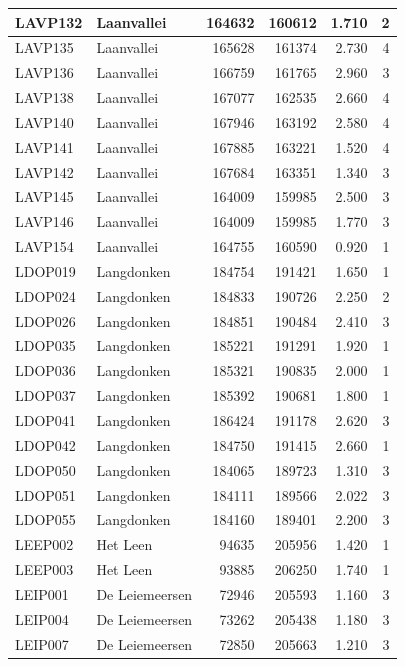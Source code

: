 \documentclass[11pt,]{book}
\begin{document}
\begin{table}
\begin{tabular}[t]{l|l|r|r|r|r}
LAVP132 & Laanvallei & 164632 & 160612 & 1.710 & 2\\
\hline
LAVP135 & Laanvallei & 165628 & 161374 & 2.730 & 4\\
\hline
LAVP136 & Laanvallei & 166759 & 161765 & 2.960 & 3\\
\hline
LAVP138 & Laanvallei & 167077 & 162535 & 2.660 & 4\\
\hline
LAVP140 & Laanvallei & 167946 & 163192 & 2.580 & 4\\
\hline
LAVP141 & Laanvallei & 167885 & 163221 & 1.520 & 4\\
\hline
LAVP142 & Laanvallei & 167684 & 163351 & 1.340 & 3\\
\hline
LAVP145 & Laanvallei & 164009 & 159985 & 2.500 & 3\\
\hline
LAVP146 & Laanvallei & 164009 & 159985 & 1.770 & 3\\
\hline
LAVP154 & Laanvallei & 164755 & 160590 & 0.920 & 1\\
\hline
LDOP019 & Langdonken & 184754 & 191421 & 1.650 & 1\\
\hline
LDOP024 & Langdonken & 184833 & 190726 & 2.250 & 2\\
\hline
LDOP026 & Langdonken & 184851 & 190484 & 2.410 & 3\\
\hline
LDOP035 & Langdonken & 185221 & 191291 & 1.920 & 1\\
\hline
LDOP036 & Langdonken & 185321 & 190835 & 2.000 & 1\\
\hline
LDOP037 & Langdonken & 185392 & 190681 & 1.800 & 1\\
\hline
LDOP041 & Langdonken & 186424 & 191178 & 2.620 & 3\\
\hline
LDOP042 & Langdonken & 184750 & 191415 & 2.660 & 1\\
\hline
LDOP050 & Langdonken & 184065 & 189723 & 1.310 & 3\\
\hline
LDOP051 & Langdonken & 184111 & 189566 & 2.022 & 3\\
\hline
LDOP055 & Langdonken & 184160 & 189401 & 2.200 & 3\\
\hline
LEEP002 & Het Leen & 94635 & 205956 & 1.420 & 1\\
\hline
LEEP003 & Het Leen & 93885 & 206250 & 1.740 & 1\\
\hline
LEIP001 & De Leiemeersen & 72946 & 205593 & 1.160 & 3\\
\hline
LEIP004 & De Leiemeersen & 73262 & 205438 & 1.180 & 3\\
\hline
LEIP007 & De Leiemeersen & 72850 & 205663 & 1.210 & 3\\
\hline

\end{tabular}
\end{table}
\end{document}
